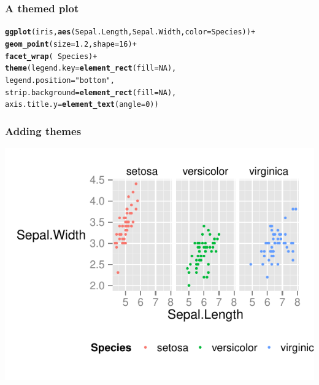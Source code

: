 \documentclass{beamer}\usepackage[]{graphicx}\usepackage[]{color}
\makeatletter
\newcommand{\hlnum}[1]{\textcolor[rgb]{0.686,0.059,0.569}{#1}}%
\newcommand{\hlstr}[1]{\textcolor[rgb]{0.192,0.494,0.8}{#1}}%
\newcommand{\hlopt}[1]{\textcolor[rgb]{0,0,0}{#1}}%
\newcommand{\hlstd}[1]{\textcolor[rgb]{0.345,0.345,0.345}{#1}}%
\newcommand{\hlkwc}[1]{\textcolor[rgb]{0.333,0.667,0.333}{#1}}%
\newcommand{\hlkwd}[1]{\textcolor[rgb]{0.737,0.353,0.396}{\textbf{#1}}}%
\newenvironment{kframe}{%
 \def\at@end@of@kframe{}%
 \ifinner\ifhmode%
  \def\at@end@of@kframe{\end{minipage}}%
  \begin{minipage}{\columnwidth}%
 \fi\fi%
 \def\FrameCommand##1{\hskip\@totalleftmargin \hskip-\fboxsep
 \colorbox{shadecolor}{##1}\hskip-\fboxsep
     \hskip-\linewidth \hskip-\@totalleftmargin \hskip\columnwidth}%
 \MakeFramed {\advance\hsize-\width
   \@totalleftmargin\z@ \linewidth\hsize
   \@setminipage}}%
 {\par\unskip\endMakeFramed%
 \at@end@of@kframe}
\newenvironment{knitrout}{}{} %
\makeatother
\begin{document}

\begin{frame}[fragile]
\frametitle{A themed plot}
\begin{knitrout}\footnotesize
{}\color{fgcolor}\begin{kframe}
\begin{alltt}
\hlkwd{ggplot}\hlstd{(iris,} \hlkwd{aes}\hlstd{(Sepal.Length, Sepal.Width,} \hlkwc{color} \hlstd{= Species))} \hlopt{+}
\hlkwd{geom_point}\hlstd{(}\hlkwc{size} \hlstd{=} \hlnum{1.2}\hlstd{,} \hlkwc{shape} \hlstd{=} \hlnum{16}\hlstd{)} \hlopt{+}
\hlkwd{facet_wrap}\hlstd{(} \hlopt{~} \hlstd{Species)} \hlopt{+}
\hlkwd{theme}\hlstd{(}\hlkwc{legend.key} \hlstd{=} \hlkwd{element_rect}\hlstd{(}\hlkwc{fill} \hlstd{=} \hlnum{NA}\hlstd{),}
\hlkwc{legend.position} \hlstd{=} \hlstr{"bottom"}\hlstd{,}
\hlkwc{strip.background} \hlstd{=} \hlkwd{element_rect}\hlstd{(}\hlkwc{fill} \hlstd{=} \hlnum{NA}\hlstd{),}
\hlkwc{axis.title.y} \hlstd{=} \hlkwd{element_text}\hlstd{(}\hlkwc{angle} \hlstd{=} \hlnum{0}\hlstd{))}
\end{alltt}
\end{kframe}
\end{knitrout}
\end{frame}


\begin{frame}[fragile]
\frametitle{Adding themes}
\begin{knitrout}\footnotesize
{}\color{fgcolor}
\includegraphics[width=.75\linewidth]{figure/facet_wrap_theme_execc} 

\end{knitrout}
\end{frame}
\end{document}
